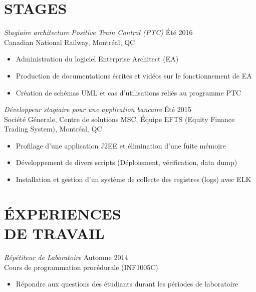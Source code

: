 \documentclass[margin, 10pt]{res} %
\begin{document}
\begin{resume}
\section{ STAGES}

{\sl Stagiaire architecture Positive Train Control (PTC)} \hfill \'Et\'e 2016 \\
Canadian National Railway, Montr\'eal, QC
\begin{itemize} \itemsep -2pt %
\item Administration du logiciel Enterprise Architect (EA)
\item Production de documentations \'ecrites et vid\'eos sur le fonctionnement de EA
\item Cr\'eation de sch\'emas UML et cas d'utilisations reli\'es au programme PTC
\end{itemize}

{\sl D\'eveloppeur stagiaire pour une application bancaire} \hfill \'Et\'e 2015 \\
Soci\'et\' e G\'enerale, Centre de solutions MSC, \'Equipe EFTS (Equity Finance Trading System), Montr\'eal, QC
\begin{itemize} \itemsep -2pt %
\item Profilage d'une application J2EE et \'elimination d'une fuite m\'emoire
\item  D\'eveloppement de divers scripts (D\'eploiement, v\'erification, data dump)
\item  Installation et gestion d'un syst\`eme de collecte des registres (logs) avec ELK
\end{itemize}
 
 
\section{\'EXPERIENCES \\ DE TRAVAIL}

{\sl R\'ep\'etiteur de Laboratoire} \hfill Automne 2014 \\
Cours de programmation proc\'edurale (INF1005C)
\begin{itemize} \itemsep -2pt %
\item R\'epondre aux questions des \'etudiants durant les p\'eriodes de laboratoire
\end{itemize}


\end{resume}
\end{document}
